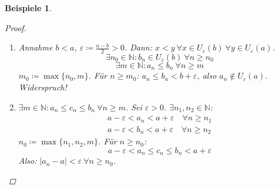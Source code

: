 \documentclass[titlepage,ngerman,a4paper,headsepline]{scrartcl}
\newcommand{\N}{\mathbb{N}}
\theoremstyle{named}
\theoremstyle{dotless}
\newtheorem*{beispiele}{Beispiele}
\begin{document}
\begin{beispiele}
\begin{proof}
\begin{enumerate}
\begin{enumerate}
					$$
						c_{n} \leq c(|b_{n}-b| + |a_{n}-a|) \eqqcolon \alpha_{n} \xRightarrow[c) (ii), c) (iii)]{a)} \alpha_{n} \rightarrow 0
					$$
					Also: $|c_{n} - 0| = c_{n} \leq \alpha_{n} ~\forall n \in \N$ und $\alpha_{n} \rightarrow 0 \xRightarrow[]{b)} c_{n} \rightarrow 0$.
				\item $\varepsilon \coloneqq \frac{|a|}{2}$; aus (i): $|a_{n}| \rightarrow |a| \Rightarrow \exists n \in N$:
					$$  |a_{n}| \in U_{\varepsilon}(|a|) = (|a| - \varepsilon, |a| + \varepsilon) = (\frac{|a|}{2}, \frac{3}{2} |a|) \quad \forall n \geq m $$
					$\Rightarrow |a_{n}| > \frac{|a|}{2} > 0 ~\forall n \geq m \Rightarrow a_{n} \neq 0 ~\forall n \geq m$. Für $n \geq m$:
					$$ \left| \frac{1}{a_{n}} - \frac{1}{a} \right| = \frac{|a_{n} - a|}{|a_{n}||a|} \leq \frac{2|a_{n} - a|}{|a|^{2}} \eqqcolon \alpha_{n} $$
					$\alpha_{n} \rightarrow 0 \xRightarrow[]{b)} \frac{1}{a_{n}} \rightarrow \frac{1}{a}$.
			  \end{enumerate}
			\item Annahme $b < a$, $\varepsilon \coloneqq \frac{a-b}{2} > 0$.  
				Dann: $x < y ~\forall x \in U_{\varepsilon}(b) ~\forall y \in U_{\varepsilon}(a)$. 
					$$ \exists n_{0} \in \N: b_{n} \in U_{\varepsilon}(b) ~\forall n \geq n_{0} $$
					$$ \exists m \in \N: a_{n} \leq b_{n} ~\forall n \geq m $$
				$m_{0} \coloneqq \max \{ n_{0}, m \}$. Für $n \geq m_{0}$: $a_{n} \leq b_{n} < b + \varepsilon$, also $a_{n} \notin U_{\varepsilon}(a)$. Widerspruch!   
			\item $\exists m \in \N: a_{n} \leq c_{n} \leq b_{n} ~\forall n \geq m$. Sei $\varepsilon > 0$. $\exists n_{1}, n_{2} \in \N$: 
				\begin{align*}
					a - \varepsilon < a_{n} < a + \varepsilon \quad \forall n \geq n_{1} \\
					a - \varepsilon < b_{n} < a + \varepsilon \quad \forall n \geq n_{2}
				\end{align*}
				$n_{0} \coloneqq \max \{ n_{1}, n_{2}, m \}$. Für $n \geq n_{0}$:
				$$
					a - \varepsilon < a_{n} \leq c_{n} \leq b_{n} < a + \varepsilon
				$$
				Also: $|a_{n} - a| < \varepsilon ~\forall n \geq n_{0}$.
		\end{enumerate}	
	\end{proof}	
\end{beispiele}
\end{document}
